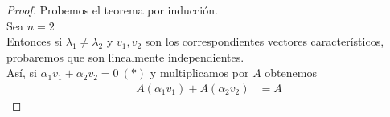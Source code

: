 \documentclass[10pt,a4paper]{report}
\newtheorem{theorem}{Teorema}[chapter]
\newtheorem{lemma}[theorem]{Lema}
\theoremstyle{definition}
\newtheorem{dfn}{Definición}[chapter]
\newtheorem{ejemplo}{Ejemplo}[chapter]
\newtheorem{ejercicio}{Ejercicio}[chapter]
\theoremstyle{remark}
\numberwithin{section}{chapter}
\numberwithin{equation}{chapter}
\numberwithin{tacounter}{chapter}
\begin{document}
\begin{proof}
Probemos el teorema por inducción.\\
Sea $n=2$\\
Entonces si $\lambda_1 \neq \lambda_2$ y $v_1 , v_2$ son los correspondientes vectores característicos, probaremos que son linealmente independientes.\\
Así, si $\alpha_1 v_1 + \alpha_2 v_2 = 0 \: (*)$ y multiplicamos por $A$ obtenemos 
\begin{align*}
A(\alpha_1 v_1) + A(\alpha_2 v_2) &= A 
\end{align*}
\end{proof}


%
%
%
%
%

\end{document}
